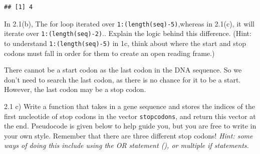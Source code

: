 \documentclass[
]{article}
\begin{document}
\begin{verbatim}
## [1] 4
\end{verbatim}

In 2.1(b), The for loop iterated over \texttt{1:(length(seq)-5)},whereas
in 2.1(c), it will iterate over \texttt{1:(length(seq)-2)}.. Explain the
logic behind this difference. (Hint: to understand
\texttt{1:(length(seq)-5)} in 1c, think about where the start and stop
codons must fall in order for them to create an open reading frame.)
\span

{ There cannot be a start codon as the last codon in the DNA sequence.
So we don't need to search the last codon, as there is no chance for it
to be a start. However, the last codon may be a stop codon. }

2.1 c) Write a function that takes in a gene sequence and stores the
indices of the first nucleotide of stop codons in the vector
\texttt{stopcodons}, and return this vector at the end. Pseudocode is
given below to help guide you, but you are free to write in your own
style. Remember that there are three different stop codons! \emph{Hint:
some ways of doing this include using the OR statement
(\texttt{\textbar{}\textbar{}}), or multiple if statements.}\span
\end{document}
